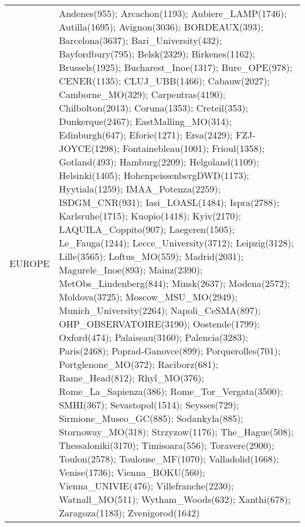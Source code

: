 \documentclass[journal abbreviation, manuscript]{copernicus}
\begin{document}
\begin{table}
 \tiny
 \begin{tabularx}{\textwidth}{lX}
\middlehline
    EUROPE &                                                                                                                                                                                                                                                                                                                                                                                                                                                                                                                                     Andenes(955); Arcachon(1193); Aubiere\_LAMP(1746); Autilla(1695); Avignon(3036); BORDEAUX(393); Barcelona(3637); Bari\_University(432); Bayfordbury(795); Belsk(2329); Birkenes(1162); Brussels(1925); Bucharest\_Inoe(1317); Bure\_OPE(978); CENER(1135); CLUJ\_UBB(1466); Cabauw(2027); Camborne\_MO(329); Carpentras(4190); Chilbolton(2013); Coruna(1353); Creteil(353); Dunkerque(2467); EastMalling\_MO(314); Edinburgh(647); Eforie(1271); Ersa(2429); FZJ-JOYCE(1298); Fontainebleau(1001); Frioul(1358); Gotland(493); Hamburg(2209); Helgoland(1109); Helsinki(1405); HohenpeissenbergDWD(1173); Hyytiala(1259); IMAA\_Potenza(2259); ISDGM\_CNR(931); Iasi\_LOASL(1484); Ispra(2788); Karlsruhe(1715); Kuopio(1418); Kyiv(2170); LAQUILA\_Coppito(907); Laegeren(1505); Le\_Fauga(1244); Lecce\_University(3712); Leipzig(3128); Lille(3565); Loftus\_MO(559); Madrid(2031); Magurele\_Inoe(893); Mainz(2390); MetObs\_Lindenberg(844); Minsk(2637); Modena(2572); Moldova(3725); Moscow\_MSU\_MO(2949); Munich\_University(2264); Napoli\_CeSMA(897); OHP\_OBSERVATOIRE(3190); Oostende(1799); Oxford(474); Palaiseau(3160); Palencia(3283); Paris(2468); Poprad-Ganovce(899); Porquerolles(701); Portglenone\_MO(372); Raciborz(681); Rame\_Head(812); Rhyl\_MO(376); Rome\_La\_Sapienza(386); Rome\_Tor\_Vergata(3500); SMHI(367); Sevastopol(1514); Seysses(729); Sirmione\_Museo\_GC(885); Sodankyla(885); Stornoway\_MO(318); Strzyzow(1176); The\_Hague(508); Thessaloniki(3170); Timisoara(556); Toravere(2900); Toulon(2578); Toulouse\_MF(1070); Valladolid(1668); Venise(1736); Vienna\_BOKU(560); Vienna\_UNIVIE(476); Villefranche(2230); Watnall\_MO(511); Wytham\_Woods(632); Xanthi(678); Zaragoza(1183); Zvenigorod(1642) \\

\end{tabularx}
\end{table}
\end{document}
